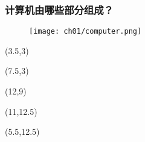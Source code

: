 \begin{frame}[fragile]
    \frametitle{计算机由哪些部分组成？}

    \begin{overlayarea}{\textwidth}{\textheight}
        \begin{figure}
            \texttt{[image: ch01/computer.png]}
        \end{figure}

        \begin{textblock}{5}(3.5,3)
        \end{textblock}

        \begin{textblock}{5}(7.5,3)
        \end{textblock}

        \begin{textblock}{5}(12,9)
        \end{textblock}

        \begin{textblock}{5}(11,12.5)
        \end{textblock}

        \begin{textblock}{5}(5.5,12.5)
        \end{textblock}
    \end{overlayarea}
\end{frame}

